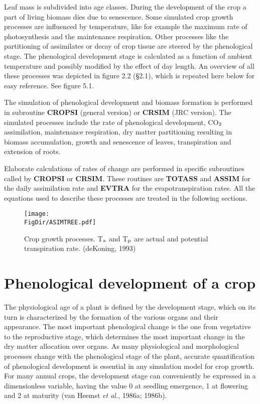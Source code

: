 Leaf mass is subdivided into age classes. During the development of the crop a part of
living biomass dies due to senescence. Some simulated crop growth processes are
influenced by temperature, like for example the maximum rate of photosyn\-thesis and the
maintenance respiration. Other processes like the partitioning of assimilates or decay of
crop tissue are steered by the phenological stage. The phenological development stage is
calculated as a function of ambient temperature and possibly modified by the effect of day
length. An overview of all these processes was depicted in figure 2.2 (\S 2.1), which is
repeated here below for easy reference. See figure 5.1.

The simulation of phenological development and biomass formation is performed in
subroutine {\bf CROPSI} (general version) or {\bf CRSIM} (JRC version). The simulated process\-es
include the rate of pheno\-logical develop\-ment, CO$_{{\rm 2}}$ assimilation, mainte\-nance respiration,
dry matter partition\-ing resulting in biomass accumulation, growth and senescence of
leaves, transpiration and extension of roots. 

Elaborate calculations of rates of change are performed in specific subroutines called by
{\bf CROPSI} or {\bf CRSIM}. These routines are {\bf TOTASS} and {\bf ASSIM} for the daily assimilation
rate and {\bf EVTRA} for the evapotranspiration rates. All the equations used to describe these
processes are treated in the following sections.

\begin{figure}[p]
\centering
\texttt{[image: \\FigDir/ASIMTREE.pdf]}
\caption{Crop growth processes. \small T$_{{\rm a}}$ and T$_{{\rm p}}$ are actual and potential 
transpiration rate. (deKoning, 1993)}
\label{fig:CropGrowthProcesses}
\end{figure}

\section{Phenological development of a crop}

The physio\-logical age of a plant is defined by the development stage, which on its turn is
characterized by the forma\-tion of the various organs and their appear\-ance. The most
important phenological change is the one from vegetative to the reproduc\-tive stage, which
determines the most important change in the dry matter allocation over organs. As many
physiologi\-cal and morphological processes change with the phenological stage of the
plant, accurate quantification of phenological development is essential in any simulation
model for crop growth. For many annual crops, the development stage can conveniently
be expressed in a dimensionless variable, having the value 0 at seedling emergence, 1 at
flowering and 2 at maturity (van Heemst {\it et al.}, 1986a; 1986b). 

